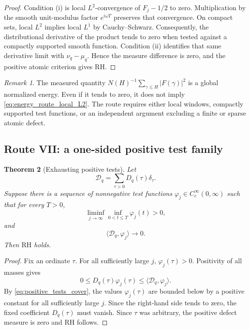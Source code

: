 \documentclass[11pt]{amsart}
\numberwithin{equation}{section}
\theoremstyle{plain}
\newtheorem{theorem}{Theorem}[section]
\theoremstyle{definition}
\theoremstyle{remark}
\newtheorem{remark}[theorem]{Remark}
\newcommand{\RH}{\mathrm{RH}}
\newcommand{\1}{\mathbf{1}}
\begin{document}
\begin{proof}
Condition (i) is local \(L^2\)-convergence of \(F_j-1/2\) to zero.
Multiplication by the smooth unit-modulus factor \(e^{i\omega T}\) preserves
that convergence.  On compact sets, local \(L^2\) implies local \(L^1\) by
Cauchy--Schwarz.  Consequently, the distributional derivative of the
product tends to zero when tested against a compactly supported smooth
function.  Condition (ii) identifies that same derivative limit with
\(\nu_q-\mu_q\).  Hence the measure difference is zero, and the positive
atomic criterion gives \(\RH\).
\end{proof}

\begin{remark}
\label{rem:global_variance_insufficient_RH_route}
The measured quantity \(N(H)^{-1}\sum_{\gamma\leq H}|F(\gamma)|^2\) is a
global normalized energy.  Even if it tends to zero, it does not imply
\eqref{eq:energy_route_local_L2}.  The route requires either local windows,
compactly supported test functions, or an independent argument excluding a
finite or sparse atomic defect.
\end{remark}

\subsection{Route VII: a one-sided positive test family}
\label{subsec:route_positive_tests}

\begin{theorem}[Exhausting positive tests]
\label{thm:exhausting_positive_tests}
Let
\begin{equation}
\mathcal D_q
=
\sum_{\tau>0}D_q(\tau)\delta_\tau.
\label{eq:positive_defect_measure_route}
\end{equation}
Suppose there is a sequence of nonnegative test functions
\(\varphi_j\in C_c^\infty(0,\infty)\) such that for every \(T>0\),
\begin{equation}
\liminf_{j\to\infty}
\inf_{0<t\leq T}\varphi_j(t)>0,
\label{eq:positive_tests_cover}
\end{equation}
and
\begin{equation}
\langle\mathcal D_q,\varphi_j\rangle\longrightarrow0.
\label{eq:positive_tests_vanish}
\end{equation}
Then \(\RH\) holds.
\end{theorem}

\begin{proof}
Fix an ordinate \(\tau\).  For all sufficiently large \(j\),
\(\varphi_j(\tau)>0\).  Positivity of all masses gives
\begin{equation}
0\leq
D_q(\tau)\varphi_j(\tau)
\leq
\langle\mathcal D_q,\varphi_j\rangle.
\label{eq:positive_tests_atom_bound}
\end{equation}
By \eqref{eq:positive_tests_cover}, the values
\(\varphi_j(\tau)\) are bounded below by a positive constant for all
sufficiently large \(j\).  Since the right-hand side tends to zero, the
fixed coefficient \(D_q(\tau)\) must vanish.  Since \(\tau\) was arbitrary, the positive defect
measure is zero and \(\RH\) follows.
\end{proof}
\end{document}
